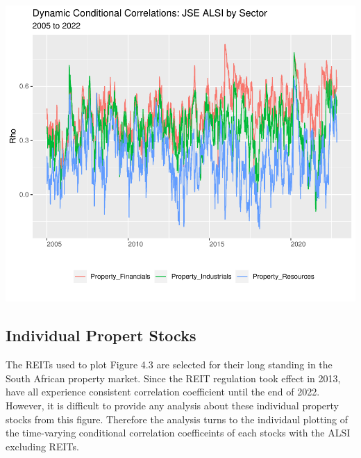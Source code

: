 \documentclass[11pt,preprint, authoryear]{elsarticle}
\let\origfigure\figure
\let\endorigfigure\endfigure
\renewenvironment{figure}[1][2] {
    \expandafter\origfigure\expandafter[H]
} {
    \endorigfigure
}
\numberwithin{equation}{section}
\numberwithin{figure}{section}
\numberwithin{table}{section}
\begin{document}
\begin{figure}
\centering
\includegraphics{Fin_Metrics_Project_files/figure-latex/unnamed-chunk-8-1.pdf}
\caption{Dynamic Conditional Correlations Graph}
\end{figure}

\hypertarget{individual-propert-stocks}{%
\subsection{Individual Propert Stocks}\label{individual-propert-stocks}}

The REITs used to plot Figure 4.3 are selected for their long standing
in the South African property market. Since the REIT regulation took
effect in 2013, have all experience consistent correlation coefficient
until the end of 2022. However, it is difficult to provide any analysis
about these individual property stocks from this figure. Therefore the
analysis turns to the individaul plotting of the time-varying
conditional correlation coefficeints of each stocks with the ALSI
excluding REITs.
\end{document}
